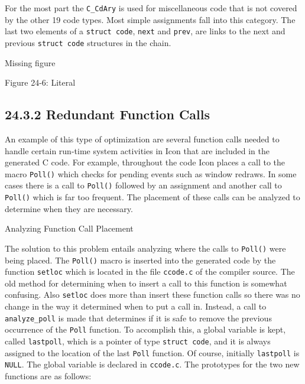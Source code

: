 For the most part the \texttt{C\_CdAry} is used for miscellaneous code
that is not covered by the other 19 code types. Most simple
assignments fall into this category. The last two elements of a
\texttt{struct code}, \texttt{next} and \texttt{prev}, are links to
the next and previous \texttt{struct code} structures in the chain.


\bigskip

\begin{center}{\color{red} Missing figure}\end{center}
\bigskip

{\centering{}
Figure 24-6: Literal
\par}

\subsection[24.3.2 Redundant Function Calls]{24.3.2 Redundant Function Calls}

An example of this type of optimization are several function calls
needed to handle certain run-time system activities in Icon that are
included in the generated C code. For example, throughout the code
Icon places a call to the macro \texttt{Poll()} which checks for
pending events such as window redraws. In some cases there is a call
to \texttt{Poll()} followed by an assignment and another call to
\texttt{Poll()} which is far too frequent. The placement of these
calls can be analyzed to determine when they are necessary.

{\sffamily
Analyzing Function Call Placement}

The solution to this problem entails analyzing where the calls to
\texttt{Poll()} were being placed. The \texttt{Poll()} macro is
inserted into the generated code by the function \texttt{setloc} which
is located in the file \texttt{ccode.c} of the compiler source. The
old method for determining when to insert a call to this function is
somewhat confusing. Also \texttt{setloc} does more than insert these
function calls so there was no change in the way it determined when to
put a call in. Instead, a call to \texttt{analyze\_poll} is made that
determines if it is safe to remove the previous occurrence of the
\texttt{Poll} function. To accomplish this, a global variable is kept,
called \texttt{lastpoll}, which is a pointer of type \texttt{struct
code}, and it is always assigned to the location of the last
\texttt{Poll} function. Of course, initially \texttt{lastpoll} is
\texttt{NULL}. The global variable is declared in
\texttt{ccode.c}. The prototypes for the two new functions are as
follows:

